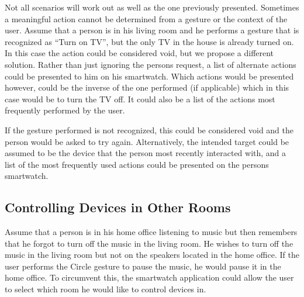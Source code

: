 Not all scenarios will work out as well as the one previously presented.
Sometimes a meaningful action cannot be determined from a gesture or the context of the user.
Assume that a person is in his living room and he performs a gesture that is recognized as ``Turn on TV'', but the only TV in the house is already turned on.
In this case the action could be considered void, but we propose a different solution.
Rather than just ignoring the persons request, a list of alternate actions could be presented to him on his smartwatch. Which actions would be presented however, could be the inverse of the one performed (if applicable) which in this case would be to turn the TV off.
It could also be a list of the actions most frequently performed by the user.

If the gesture performed is not recognized, this could be considered void and the person would be asked to try again. Alternatively, the intended target could be assumed to be the device that the person most recently interacted with, and a list of the most frequently used actions could be presented on the persons smartwatch.

\subsection{Controlling Devices in Other Rooms}
\label{sec:analysis:scenarios:other_rooms}

Assume that a person is in his home office listening to music but then remembers that he forgot to turn off the music in the living room.
He wishes to turn off the music in the living room but not on the speakers located in the home office.
If the user performs the Circle gesture to pause the music, he would pause it in the home office.
To circumvent this, the smartwatch application could allow the user to select which room he would like to control devices in.

